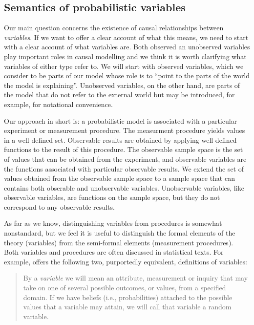 
\subsection{Semantics of probabilistic variables}\label{sec:variables}

Our main question concerns the existence of causal relationships between \emph{variables}. If we want to offer a clear account of what this means, we need to start with a clear account of what variables are. Both observed an unobserved variables play important roles in causal modelling and we think it is worth clarifying what variables of either type refer to. We will start with observed variables, which we consider to be parts of our model whose role is to ``point to the parts of the world the model is explaining''. Unobserved variables, on the other hand, are parts of the model that do not refer to the external world but may be introduced, for example, for notational convenience.

Our approach in short is: a probabilistic model is associated with a particular experiment or measurement procedure. The measurment procedure yields values in a well-defined set. Observable results are obtained by applying well-defined functions to the result of this procedure. The observable sample space is the set of values that can be obtained from the experiment, and observable variables are the functions associated with particular observable results. We extend the set of values obtained from the observable sample space to a sample space that can contains both obserable and unobservable variables. Unobservable variables, like observable variables, are functions on the sample space, but they do not correspond to any observable results.

As far as we know, distinguishing variables from procedures is somewhat nonstandard, but we feel it is useful to distinguish the formal elements of the theory (variables) from the semi-formal elements (measurement procedures). Both variables and procedures are often discussed in statistical texts. For example, \citet{pearl_causality:_2009} offers the following two, purportedly equivalent, definitions of variables:
\begin{quote}
By a \emph{variable} we will mean an attribute, measurement or inquiry that may take on one of several possible outcomes, or values, from a specified domain. If we have beliefs (i.e., probabilities) attached to the possible values that a variable may attain, we will call that variable a random variable.
\end{quote}

